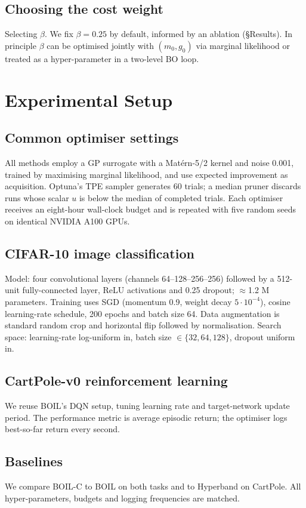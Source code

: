 \documentclass{article} %
\begin{document}
\subsection{Choosing the cost weight}
Selecting \(\beta\). We fix \(\beta=0.25\) by default, informed by an ablation (\S Results). In principle \(\beta\) can be optimised jointly with \((m_0,g_0)\) via marginal likelihood or treated as a hyper-parameter in a two-level BO loop.

\section{Experimental Setup}
\label{sec:experimental}
\subsection{Common optimiser settings}
All methods employ a GP surrogate with a Mat\'ern-5/2 kernel and noise 0.001, trained by maximising marginal likelihood, and use expected improvement as acquisition. Optuna's TPE sampler generates 60 trials; a median pruner discards runs whose scalar \(u\) is below the median of completed trials. Each optimiser receives an eight-hour wall-clock budget and is repeated with five random seeds on identical NVIDIA A100 GPUs.

\subsection{CIFAR-10 image classification}
Model: four convolutional layers (channels 64--128--256--256) followed by a 512-unit fully-connected layer, ReLU activations and 0.25 dropout; \(\approx\)1.2 M parameters. Training uses SGD (momentum 0.9, weight decay \(5 \cdot 10^{-4}\)), cosine learning-rate schedule, 200 epochs and batch size 64. Data augmentation is standard random crop and horizontal flip followed by normalisation. Search space: learning-rate log-uniform in, batch size \(\in\{32,64,128\}\), dropout uniform in.

\subsection{CartPole-v0 reinforcement learning}
We reuse BOIL's DQN setup, tuning learning rate and target-network update period. The performance metric is average episodic return; the optimiser logs best-so-far return every second.

\subsection{Baselines}
We compare BOIL-C to BOIL on both tasks and to Hyperband on CartPole. All hyper-parameters, budgets and logging frequencies are matched.
\end{document}
